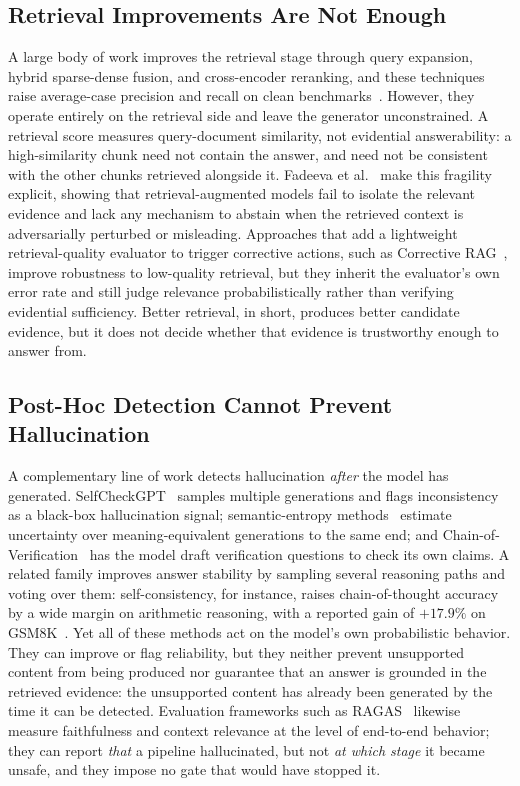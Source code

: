 \subsection{Retrieval Improvements Are Not Enough}
A large body of work improves the retrieval stage through query expansion,
hybrid sparse-dense fusion, and cross-encoder reranking, and these
techniques raise average-case precision and recall on clean
benchmarks~\cite{yu2024evaluation}. However, they operate entirely on the
retrieval side and leave the generator unconstrained. A retrieval score
measures query-document similarity, not evidential answerability: a
high-similarity chunk need not contain the answer, and need not be
consistent with the other chunks retrieved alongside it. Fadeeva et
al.~\cite{fadeeva2023reeval} make this fragility explicit, showing that
retrieval-augmented models fail to isolate the relevant evidence and lack
any mechanism to abstain when the retrieved context is adversarially
perturbed or misleading. Approaches that add a lightweight
retrieval-quality evaluator to trigger corrective actions, such as
Corrective RAG~\cite{yan2024crag}, improve robustness to low-quality
retrieval, but they inherit the evaluator's own error rate and still judge
relevance probabilistically rather than verifying evidential sufficiency.
Better retrieval, in short, produces better candidate evidence, but it
does not decide whether that evidence is trustworthy enough to answer
from.

\subsection{Post-Hoc Detection Cannot Prevent Hallucination}
A complementary line of work detects hallucination \textit{after} the
model has generated. SelfCheckGPT~\cite{manakul2023selfcheck} samples
multiple generations and flags inconsistency as a black-box hallucination
signal; semantic-entropy methods~\cite{farquhar2024semantic} estimate
uncertainty over meaning-equivalent generations to the same end; and
Chain-of-Verification~\cite{dhuliawala2023cov} has the model draft
verification questions to check its own claims. A related family improves
answer stability by sampling several reasoning paths and voting over them:
self-consistency, for instance, raises chain-of-thought accuracy by a wide
margin on arithmetic reasoning, with a reported gain of $+17.9\%$ on
GSM8K~\cite{wang2023selfconsistency}. Yet all of these methods act on the
model's own probabilistic behavior. They can improve or flag reliability,
but they neither prevent unsupported content from being produced nor
guarantee that an answer is grounded in the retrieved evidence: the
unsupported content has already been generated by the time it can be
detected. Evaluation frameworks such as RAGAS~\cite{es2023ragas} likewise
measure faithfulness and context relevance at the level of end-to-end
behavior; they can report \textit{that} a pipeline hallucinated, but not
\textit{at which stage} it became unsafe, and they impose no gate that
would have stopped it.

